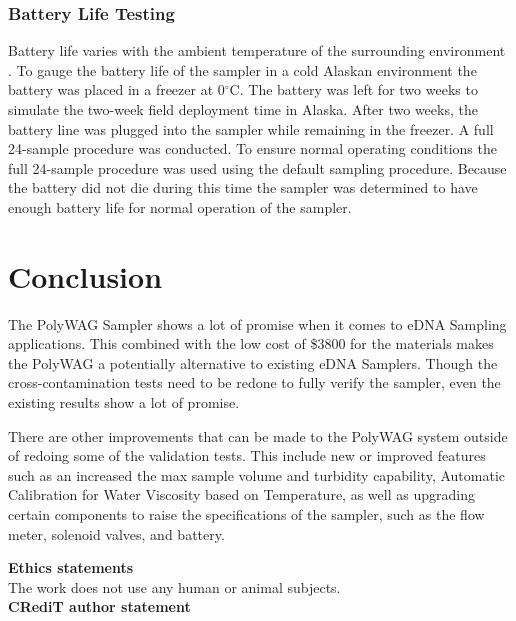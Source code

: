 \documentclass[11pt, letterpaper]{article}
\begin{document}
\subsubsection{Battery Life Testing}
Battery life varies with the ambient temperature of the surrounding environment \cite{art:Battery}. To gauge the battery life of the sampler in a cold Alaskan environment the battery was placed in a freezer at 0$^\circ$C. The battery was left for two weeks to simulate the two-week field deployment time in Alaska. After two weeks, the battery line was plugged into the sampler while remaining in the freezer. A full 24-sample procedure was conducted. To ensure normal operating conditions the full 24-sample procedure was used using the default sampling procedure. Because the battery did not die during this time the sampler was determined to have enough battery life for normal operation of the sampler.


\section{Conclusion}

The PolyWAG Sampler shows a lot of promise when it comes to eDNA Sampling applications. This combined with the low cost of \$3800 for the materials makes the PolyWAG a potentially alternative to existing eDNA Samplers. Though the cross-contamination tests need to be redone to fully verify the sampler, even the existing results show a lot of promise. 
\newline\par
There are other improvements that can be made to the PolyWAG system outside of redoing some of the validation tests. This include new or improved features such as an increased the max sample volume and turbidity capability, Automatic Calibration for Water Viscosity based on Temperature, as well as upgrading certain components to raise the specifications of the sampler, such as the flow meter, solenoid valves, and battery. 


\par\noindent\newline
\textbf{Ethics statements}\\
\noindent
The work does not use any human or animal subjects.\\


\noindent
\textbf{CRediT author statement}\\
\end{document}
